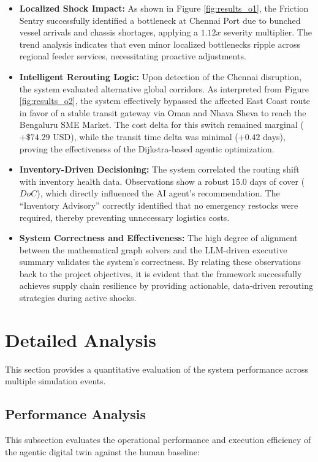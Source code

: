 \begin{itemize}
    \item \textbf{Localized Shock Impact:} As shown in Figure \ref{fig:results_o1}, the Friction Sentry successfully identified a bottleneck at Chennai Port due to bunched vessel arrivals and chassis shortages, applying a $1.12x$ severity multiplier. The trend analysis indicates that even minor localized bottlenecks ripple across regional feeder services, necessitating proactive adjustments.
    \item \textbf{Intelligent Rerouting Logic:} Upon detection of the Chennai disruption, the system evaluated alternative global corridors. As interpreted from Figure \ref{fig:results_o2}, the system effectively bypassed the affected East Coast route in favor of a stable transit gateway via Oman and Nhava Sheva to reach the Bengaluru SME Market. The cost delta for this switch remained marginal ($+\$74.29$ USD), while the transit time delta was minimal ($+0.42$ days), proving the effectiveness of the Dijkstra-based agentic optimization.
    \item \textbf{Inventory-Driven Decisioning:} The system correlated the routing shift with inventory health data. Observations show a robust $15.0$ days of cover ($DoC$), which directly influenced the AI agent's recommendation. The ``Inventory Advisory'' correctly identified that no emergency restocks were required, thereby preventing unnecessary logistics costs.
    \item \textbf{System Correctness and Effectiveness:} The high degree of alignment between the mathematical graph solvers and the LLM-driven executive summary validates the system's correctness. By relating these observations back to the project objectives, it is evident that the framework successfully achieves supply chain resilience by providing actionable, data-driven rerouting strategies during active shocks.
\end{itemize}

\section[Detailed Analysis]{Detailed Analysis}
This section provides a quantitative evaluation of the system performance across multiple simulation events.

\subsection[Performance Analysis]{Performance Analysis}
This subsection evaluates the operational performance and execution efficiency of the agentic digital twin against the human baseline:

